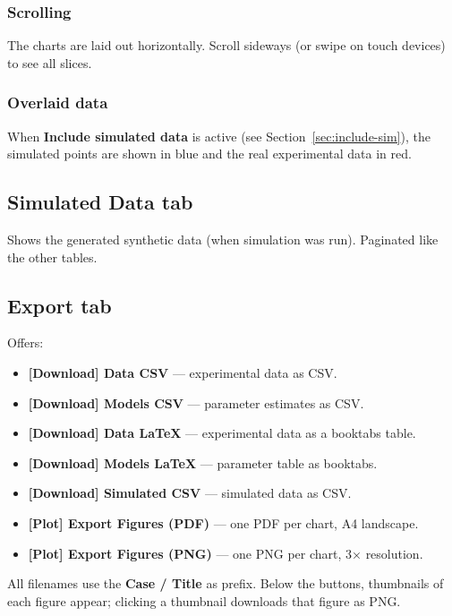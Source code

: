 \documentclass[11pt,a4paper]{article}
\begin{document}
\subsubsection*{Scrolling}

The charts are laid out horizontally. Scroll sideways (or swipe on touch devices) to see all slices.

\subsubsection*{Overlaid data}

When \textbf{Include simulated data} is active (see Section~\ref{sec:include-sim}), the simulated points are shown in blue and the real experimental data in red.

\subsection{Simulated Data tab}

Shows the generated synthetic data (when simulation was run). Paginated like the other tables.

\subsection{Export tab}

Offers:
\begin{itemize}[leftmargin=1.4em]
  \item \textbf{\textbf{[Download]} Data CSV} --- experimental data as CSV.
  \item \textbf{\textbf{[Download]} Models CSV} --- parameter estimates as CSV.
  \item \textbf{\textbf{[Download]} Data LaTeX} --- experimental data as a booktabs table.
  \item \textbf{\textbf{[Download]} Models LaTeX} --- parameter table as booktabs.
  \item \textbf{\textbf{[Download]} Simulated CSV} --- simulated data as CSV.
  \item \textbf{\textbf{[Plot]} Export Figures (PDF)} --- one PDF per chart, A4 landscape.
  \item \textbf{\textbf{[Plot]} Export Figures (PNG)} --- one PNG per chart, 3× resolution.
\end{itemize}

All filenames use the \textbf{Case / Title} as prefix. Below the buttons, thumbnails of each figure appear; clicking a thumbnail downloads that figure as PNG.
\end{document}

